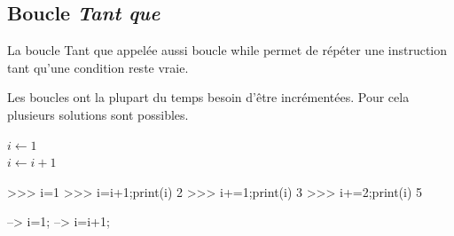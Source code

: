 \documentclass[11pt,oneside]{article}
\begin{document}
\subsection{Boucle \textsl{Tant que}}

\begin{defi}
La boucle \textsf{Tant que} appelée aussi boucle \textsf{while} permet de répéter une instruction tant qu'une condition reste vraie.
\end{defi}

\begin{rem}
Les boucles ont la plupart du temps besoin d'être incrémentées. Pour cela plusieurs solutions sont possibles.

\begin{minipage}[c]{.3\linewidth}
\begin{pseudo}
\begin{algorithm}[H]
$i \gets 1$\\
$i \gets i+1$\\
\end{algorithm}
\end{pseudo}
\end{minipage} \hfill
\begin{minipage}[c]{.3\linewidth}
\begin{py}
\begin{python}
>>> i=1
>>> i=i+1;print(i)
    2
>>> i+=1;print(i)
    3
>>> i+=2;print(i)
    5
\end{python}
\end{py}
\end{minipage} \hfill
\begin{minipage}[c]{.3\linewidth}
\begin{sci}
\begin{scilab}
--> i=1;
--> i=i+1;
\end{scilab}
\end{sci}
\end{minipage} 

\end{rem}
\end{document}
